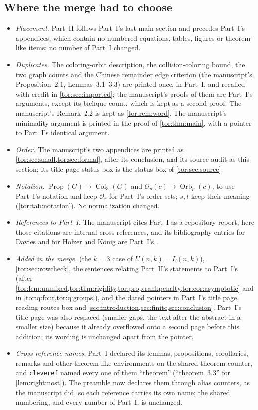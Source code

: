 \documentclass[11pt,a4paper]{article}
\numberwithin{equation}{section}
\theoremstyle{definition}
\theoremstyle{remark}
\newcommand{\Orb}{\operatorname{Orb}}
\begin{document}
\subsection{Where the merge had to choose}\label{tor:sec:merge}
\begin{itemize}
\item \emph{Placement.} Part~II follows Part~I's last main section and
 precedes Part~I's appendices, which contain no numbered equations, tables,
 figures or theorem-like items; no number of Part~I changed.
\item \emph{Duplicates.} The coloring-orbit description, the
 collision-coloring bound, the two graph counts and the Chinese remainder
 edge criterion (the manuscript's Proposition~2.1, Lemmas~3.1--3.3) are
 printed once, in Part~I, and recalled with credit in
 \cref{tor:sec:imported}; the manuscript's proofs of them are Part~I's
 arguments, except its biclique count, which is kept as a second proof. The
 manuscript's Remark~2.2 is kept as \cref{tor:rem:word}. The manuscript's
 minimality argument is printed in the proof of \cref{tor:thm:main}, with a
 pointer to Part~I's identical argument.
\item \emph{Order.} The manuscript's two appendices are printed as
 \cref{tor:sec:small,tor:sec:formal}, after its conclusion, and its source
 audit as this section; its title-page status box is the status box of
 \cref{tor:sec:source}.
\item \emph{Notation.} $\operatorname{Prop}(G)\to\operatorname{Col}_3(G)$ and
 $\mathcal O_p(c)\to\Orb_p(c)$, to use Part~I's notation and keep
 $\mathcal O_r$ for Part~I's order sets; $s,t$ keep their meaning
 (\cref{tor:tab:notation}). No normalization changed.
\item \emph{References to Part~I.} The manuscript cites Part~I as a
 repository report; here those citations are internal cross-references, and
 its bibliography entries for Davies and for Holzer and K\"onig are Part~I's
 \cite{Davies2017,HolzerKoenig2004}.
\item \emph{Added in the merge.}  (the $k=3$ case of
 $U(n,k)=L(n,k)$), \cref{tor:sec:rowcheck}, the sentences relating Part~II's
 statements to Part~I's (after \cref{tor:lem:unmixed,tor:thm:rigidity,tor:prop:rankpenalty,tor:cor:asymptotic} and
 in \cref{tor:q:four,tor:q:groups}), and the dated pointers in Part~I's title
 page, reading-routes box and \cref{sec:introduction,sec:finite,sec:conclusion}.
 Part~I's title page was also respaced (smaller gaps, the text after the
 abstract in a smaller size) because it already overflowed onto a second page
 before this addition; its wording is unchanged apart from the pointer.
\item \emph{Cross-reference names.} Part~I declared its lemmas, propositions,
 corollaries, remarks and other theorem-like environments on the shared
 theorem counter, and \texttt{cleveref} named every one of them
 ``theorem'' (``theorem~3.3'' for \cref{lem:rightmost}). The preamble now
 declares them through alias counters, as the manuscript did, so each
 reference carries its own name; the shared numbering, and every number of
 Part~I, is unchanged.
\end{itemize}
\end{document}
